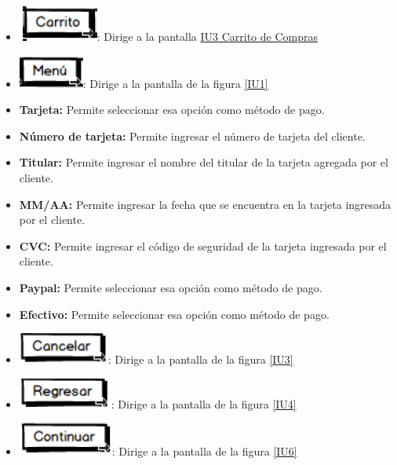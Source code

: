 	\begin{itemize}
		
		\item \includegraphics[scale=0.500]{imagenes/iconografia/Carrito.png}: Dirige a la pantalla \hyperlink{IU3}{IU3 Carrito de Compras}
		\item \includegraphics[scale=0.500]{imagenes/iconografia/Menu.png}: Dirige a la pantalla de la figura \ref{IU1}
		\item \textbf{Tarjeta:} Permite seleccionar esa opción como método de pago.
		\item \textbf{Número de tarjeta:} Permite ingresar el número de tarjeta del cliente.
		\item \textbf{Titular:} Permite ingresar el nombre del titular de la tarjeta agregada por el cliente.
		\item \textbf{MM/AA:} Permite ingresar la fecha que se encuentra en la tarjeta ingresada por el cliente.
		\item \textbf{CVC:} Permite ingresar el código de seguridad de la tarjeta ingresada por el cliente.	
		\item \textbf{Paypal:} Permite seleccionar esa opción como método de pago.
		\item \textbf{Efectivo:} Permite seleccionar esa opción como método de pago.
		\item \includegraphics[scale=0.500]{imagenes/iconografia/Cancelar.png}: Dirige a la pantalla de la figura \ref{IU3}
		\item \includegraphics[scale=0.500]{imagenes/iconografia/Regresar.png}: Dirige a la pantalla de la figura \ref{IU4}
		\item \includegraphics[scale=0.500]{imagenes/iconografia/Continuar.png}: Dirige a la pantalla de la figura \ref{IU6}
\end{itemize}

